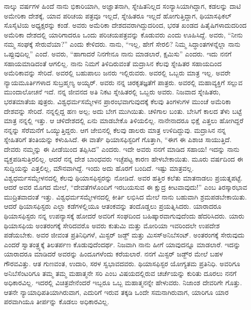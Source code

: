 ನಾಲ್ಕು ವರ್ಷಗಳ ಹಿಂದೆ ನಾನು ಭಿಕಾರಿಯಾಗಿ, ಅಜ್ಞಾತನಾಗಿ, ಸ್ನೇಹಿತನಿಲ್ಲದ ಸಂನ್ಯಾಸಿಯಾಗಿದ್ದಾಗ, ಕಡಲನ್ನು ದಾಟಿ ಅಮೇರಿಕಾ ದೇಶಕ್ಕೆ, ಯಾವ ಪರಿಚಯ ಪತ್ರವೂ ಇಲ್ಲದೆ, ಸ್ನೇಹಿತರೂ ಇಲ್ಲದೆ ಹೋಗುತ್ತಿದ್ದಾಗ, ಥಿಯಾಸಫಿಕಲ್​ ಸೊಸೈಟಿಯ ಅಧ್ಯಕ್ಷರನ್ನು ಕಂಡೆ. ಅವರು ಅಮೆರಿಕಾ ದೇಶದವರಾಗಿದ್ದುದರಿಂದ, ಭರತ ಖಂಡದ ಹಿತೈಷಿಗಳಾದುದರಿಂದ ಅಮೆರಿಕಾ ದೇಶದಲ್ಲಿ ಯಾರಿಗಾದರೂ ಒಂದು ಪರಿಚಯಪತ್ರವನ್ನು ಕೊಡುವರು ಎಂದು ಊಹಿಸಿದ್ದೆ. ಅವರು, “ನೀನು ನಮ್ಮ ಸಂಘಕ್ಕೆ ಸೇರುವೆಯಾ?” ಎಂದು ಕೇಳಿದರು. ನಾನು, “ಇಲ್ಲ, ಹೇಗೆ ಸೇರಲಿ? ನಿಮ್ಮ ಸಿದ್ಧಾಂತಗಳನ್ನೆಲ್ಲಾ ನಾನು ಒಪ್ಪುವುದಿಲ್ಲ” ಎಂದೆ. ಅವರು, “ಹಾಗಾದರೆ ನಿನಗೇನೂ ನಾನು ಮಾಡಲಾರೆ, ಕ್ಷಮಿಸು” ಎಂದರು. ಇದು ನನಗೆ ಸಹಾಯಮಾಡಿದಂತೆ ಆಗಲಿಲ್ಲ. ನಾನು ನಿಮಗೆ ತಿಳಿದಿರುವಂತೆ ಮದ್ರಾಸಿನ ಕೆಲವು ಸ್ನೇಹಿತರ ಸಹಾಯದಿಂದ ಅಮೆರಿಕಾವನ್ನು ಸೇರಿದೆ. ಅವರಲ್ಲಿ ಬಹುಪಾಲು ಜನರು ಇಲ್ಲಿರುವರು. ಅವರಲ್ಲಿ ಒಬ್ಬರು ಮಾತ್ರ ಇಲ್ಲ. ಅವರೇ ನ್ಯಾಯಮೂರ್ತಿಗಳಾದ ಸುಬ್ರಹ್ಮಣ್ಯ ಅಯ್ಯರ್​. ಅವರು ನನ್ನ ಚಿರಕೃತಜ್ಞತೆಗೆ ಪಾತ್ರರು. ಅವರಲ್ಲಿ ಮಹಾವ್ಯಕ್ತಿಗೆ ಸಲ್ಲುವ ಮುಂದಾಲೋಚನೆ ಇದೆ. ನನ್ನ ಜೀವನದ ಅತಿ ನಿಕಟ ಸ್ನೇಹಿತರಲ್ಲಿ ಒಬ್ಬರು ಅವರು. ನಿಜವಾದ ಸ್ನೇಹಿತರು, ಭರತಮಾತೆಯ ಪುತ್ರರು. ವಿಶ್ವಧರ್ಮಸಮ್ಮೇಳನ ಪ್ರಾರಂಭವಾಗುವುದಕ್ಕೆ ಕೆಲವು ತಿಂಗಳುಗಳ ಮುಂಚೆ ಅಮೆರಿಕಾ ದೇಶವನ್ನು ಸೇರಿದೆ. ನನ್ನಲ್ಲಿದ್ದ ಹಣ ಅಲ್ಪ; ಅದು ಬೇಗ ಮುಗಿಯಿತು. ಚಳಿಗಾಲ ಬಂತು. ಬೇಸಿಗೆ ಕಾಲದ ತೆಳು ಬಟ್ಟೆ ಮಾತ್ರ ನನ್ನಲ್ಲಿ ಇತ್ತು. ಆ ಚಳಿದೇಶದಲ್ಲಿ ಏನು ಮಾಡಬೇಕೊ ತಿಳಿಯಲಿಲ್ಲ. ನಾನೇನಾದರೂ ಭಿಕ್ಷೆ ಎತ್ತಲು ಹೋಗಿದ್ದರೆ ನನ್ನನ್ನು ಸೆರೆಮನೆಗೆ ಒಯ್ಯುತ್ತಿದ್ದರು. ಆಗ ಜೇಬಿನಲ್ಲಿ ಕೆಲವು ಡಾಲರು ಮಾತ್ರ ಉಳಿದಿದ್ದುವು. ಮದ್ರಾಸಿನ ನನ್ನ ಸ್ನೇಹಿತರಿಗೆ ತಂತಿಯನ್ನು ಕಳುಹಿಸಿದೆ. ಈ ವಾರ್ತೆ ಥಿಯಾಸಫಿಸ್ಟರಿಗೆ ಗೊತ್ತಾಗಿ, “ಈಗ ಈ ಪಿಶಾಚಿ ಸಾಯುತ್ತಿದೆ. ದೇವರು ನಮ್ಮನ್ನು ಈ ಪೀಡೆಯಿಂದ ತಪ್ಪಿಸಿದ” ಎಂದರು. ಇದೇ ಅವರು ನನಗೆ ಮಾಡಿದ ಸಹಾಯ! ಇದನ್ನು ನಾನು ವ್ಯಕ್ತಪಡಿಸುತ್ತಿರಲಿಲ್ಲ. ಆದರೆ ನನ್ನ ದೇಶ ಬಾಂಧವರು ಇಚ್ಛೆಪಟ್ಟ ಕಾರಣ ಹೇಳಬೇಕಾಯಿತು. ಮೂರು ವರ್ಷದಿಂದ ಈ ಸುದ್ದಿಯನ್ನು ಎತ್ತಲಿಲ್ಲ, ಮೌನವಾಗಿದ್ದೆ. ಇಂದು ಅದು ಹೊರಗೆ ಬಂದಿದೆ. ಇಷ್ಟು ಮಾತ್ರವಲ್ಲ. ವಿಶ್ವಧರ್ಮಸಮ್ಮೇಳನದಲ್ಲಿ ಕೆಲವು ಥಿಯಾಸಫಿಸ್ಟರನ್ನು ನೋಡಿದೆ. ಅವರ ಹತ್ತಿರ ಕಲೆತು ಮಾತನಾಡಲು ಪ್ರಯತ್ನಪಟ್ಟೆ. ಆದರೆ ಅವರ ಮೊಗದ ಮೇಲೆ, “ದೇವತೆಗಳೊಂದಿಗೆ ಇರಬಯಸುವ ಈ ಕ್ಷುದ್ರ ಕೀಟವಾವುದು!” ಎಂಬ ತಿರಸ್ಕಾರಭಾವ ಮುದ್ರಿತವಾದಂತೆ ಇತ್ತು. ವಿಶ್ವಧರ್ಮಸಮ್ಮೇಳನದಲ್ಲಿ ಕೀರ್ತಿ ಲಭಿಸಿದ ಮೇಲೆ ನಾನು ಬಹುವಾಗಿ ಶ್ರಮಪಡಬೇಕಾಯಿತು. ಆದರೆ ಥಿಯಾಸಫಿಸ್ಟರು ಎಲ್ಲಾ ಕಡೆಗಳಲ್ಲಿಯೂ ಆತಂಕವನ್ನು ತಂದೊಡ್ಡಲು ಪ್ರಯತ್ನಿಸಿದರು. ಯಾರಾದರೂ ಥಿಯಾಸಫಿಸ್ಟರು ನನ್ನ ಉಪನ್ಯಾಸಕ್ಕೆ ಹೋದರೆ ಅವರಿಗೆ ಸಂಘದಿಂದ ಬಹಿಷ್ಕಾರವಾಗುವುದೆಂದು ಹೆದರಿಸಿ\-ದರು. ಯಾರು ಥಿಯಾಸಫಿಯ ಅಂತರಂಗಕ್ಕೆ ಸೇರಿದವರೊ ಅವರು ಕುತುಮಿ ಮತ್ತು ಮೋರಿಯಾ ಇವರಿಂದಲೇ ಉಪದೇಶ ಪಡೆಯಬೇಕು. ಅವರ ಜೀವಂತ ಪ್ರತಿನಿಧಿಗಳೆ, ಮಿಸ್ಟರ್​ ಜಡ್ಜ್ ಮತ್ತು ಮಿಸಸ್​ ಅನಿಬೆಸಂಟ್​. ಅಂತರಂಗಕ್ಕೆ ಸೇರುವುದು ಎಂದರೆ ಸ್ವಾತಂತ್ರ್ಯಕ್ಕೆ ತಿಲತರ್ಪಣ ಕೊಡುವುದೆಂದರ್ಥ. ನಿಜವಾಗಿ ನಾನು ಹೀಗೆ ಯಾವುದನ್ನೂ ಮಾಡಲಾರೆ. ಇದನ್ನು ಯಾರಾದರೂ ಮಾಡಿದರೆ ಅವರನ್ನು ಹಿಂದೂಗಳೆಂದು ಕರೆಯಲಾರೆ. ನನಗೆ ಮಿಸ್ಟರ್​ ಜಡ್ಜ್‌ರ ಮೇಲೆ ಬಹಳ ಗೌರವವಿತ್ತು. ಆತ ಗುಣವಂತ, ಉದಾರಿ, ಸರಳ ಸ್ವಭಾವದವರು. ಥಿಯಾಸಫಿಸ್ಟರ ಯೋಗ್ಯತಮ ಪ್ರತಿನಿಧಿ. ಅವರಿಗೂ ಅನಿಬೆಸೆಂಟರಿಗೂ ತಮ್ಮ ತಮ್ಮ ಮಹಾತ್ಮನೇ ಸರಿ ಎಂಬ ವಿಷಯದಲ್ಲಿರುವ ಚರ್ಚೆಯನ್ನು ಕುರಿತು ದೂರಲು ನನಗೆ ಅಧಿಕಾರವಿಲ್ಲ. ಇದರಲ್ಲಿ ವಿಚಿತ್ರವೇನೆಂದರೆ ಇಬ್ಬರೂ ಒಬ್ಬ ಮಹಾತ್ಮನನ್ನೇ ಹೇಳುವರು. ನಿಜಾಂಶ ದೇವರಿಗೇ ಗೊತ್ತು. ಆತನೇ ನ್ಯಾಯಾಧಿಪತಿಯಾಗಿರುವಾಗ, ಎದುರಿಗೆ ಇರುವ ತಕ್ಕಡಿ ಒಂದೇ ಸಮನಾಗಿರುವಾಗ, ಯಾರಿಗೂ ಯಾರ ಪರವಾಗಿಯೂ ತೀರ್ಪನ್ನು ಕೊಡಲು ಅಧಿಕಾರವಿಲ್ಲ.

